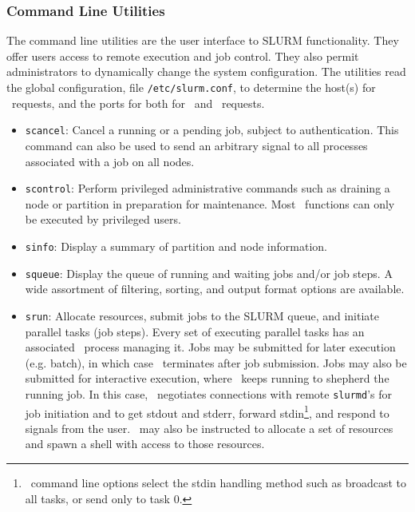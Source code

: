 \begin{itemize}

\end{itemize}

\subsubsection{Command Line Utilities}

The command line utilities are the user interface to SLURM functionality.
They offer users access to remote execution and job control. They also 
permit administrators to dynamically change the system configuration. The 
utilities read the global configuration, file {\tt /etc/slurm.conf}, 
to determine the host(s) for \slurmctld\ requests, and the ports for 
both for \slurmctld\ and \slurmd\ requests. 

\begin{itemize}
\item {\tt scancel}: Cancel a running or a pending job, subject to
authentication. This command can also be used to send an arbitrary 
signal to all processes associated with a job on all nodes.

\item {\tt scontrol}: Perform privileged administrative commands
such as draining a node or partition in preparation for maintenance. 
Most \scontrol\ functions can only be executed by privileged users.

\item {\tt sinfo}: Display a summary of partition and node information.

\item {\tt squeue}: Display the queue of running and waiting jobs 
and/or job steps. A wide assortment of filtering, sorting, and output 
format options are available.

\item {\tt srun}: Allocate resources, submit jobs to the SLURM queue,
and initiate parallel tasks (job steps). 
Every set of executing parallel tasks has an associated \srun\ process managing it. 
Jobs may be submitted for later execution (e.g. batch), in which case 
\srun\ terminates after job submission. 
Jobs may also be submitted for interactive execution, where \srun\ keeps 
running to shepherd the running job. In this case, 
\srun\ negotiates connections with remote {\tt slurmd}'s 
for job initiation and to
get stdout and stderr, forward stdin\footnote{\srun\ command
line options select the stdin handling method such as broadcast to all
tasks, or send only to task 0.}, and respond to signals from the user.
\srun\ may also be instructed to allocate a set of resources and
spawn a shell with access to those resources.

\end{itemize}

